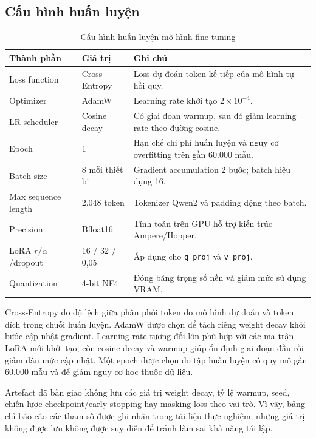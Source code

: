 \documentclass[12pt,a4paper,oneside]{report}
\begin{document}
\subsection{Cấu hình huấn luyện}
\begin{table}[H]
\centering
\caption{Cấu hình huấn luyện mô hình fine-tuning}
\label{tab:finetune-config}
\begin{tabularx}{\textwidth}{p{4.2cm}p{3.2cm}Y}
\toprule
\textbf{Thành phần} & \textbf{Giá trị} & \textbf{Ghi chú}\\
\midrule
Loss function & Cross-Entropy & Loss dự đoán token kế tiếp của mô hình tự hồi quy.\\
Optimizer & AdamW & Learning rate khởi tạo $2\times10^{-4}$.\\
LR scheduler & Cosine decay & Có giai đoạn warmup, sau đó giảm learning rate theo đường cosine.\\
Epoch & 1 & Hạn chế chi phí huấn luyện và nguy cơ overfitting trên gần 60.000 mẫu.\\
Batch size & 8 mỗi thiết bị & Gradient accumulation 2 bước; batch hiệu dụng 16.\\
Max sequence length & 2.048 token & Tokenizer Qwen2 và padding động theo batch.\\
Precision & Bfloat16 & Tính toán trên GPU hỗ trợ kiến trúc Ampere/Hopper.\\
LoRA $r/\alpha$/dropout & 16 / 32 / 0,05 & Áp dụng cho \texttt{q\_proj} và \texttt{v\_proj}.\\
Quantization & 4-bit NF4 & Đóng băng trọng số nền và giảm mức sử dụng VRAM.\\
\bottomrule
\end{tabularx}
\end{table}

Cross-Entropy đo độ lệch giữa phân phối token do mô hình dự đoán và token đích trong chuỗi huấn luyện. AdamW được chọn để tách riêng weight decay khỏi bước cập nhật gradient. Learning rate tương đối lớn phù hợp với các ma trận LoRA mới khởi tạo, còn cosine decay và warmup giúp ổn định giai đoạn đầu rồi giảm dần mức cập nhật. Một epoch được chọn do tập huấn luyện có quy mô gần 60.000 mẫu và để giảm nguy cơ học thuộc dữ liệu.

Artefact đã bàn giao không lưu các giá trị weight decay, tỷ lệ warmup, seed, chiến lược checkpoint/early stopping hay masking loss theo vai trò. Vì vậy, bảng chỉ báo cáo các tham số được ghi nhận trong tài liệu thực nghiệm; những giá trị không được lưu không được suy diễn để tránh làm sai khả năng tái lập.
\end{document}
